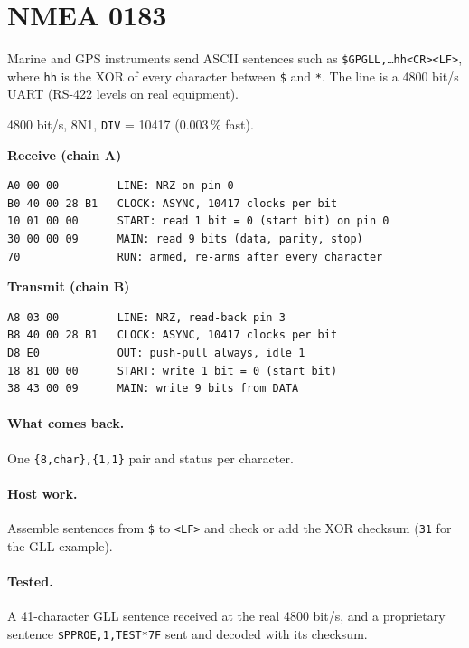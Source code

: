 \documentclass[11pt,a4paper]{article}
\newcommand{\sig}[1]{\texttt{#1}}
\newcommand{\progtitle}[1]{\par\smallskip\textbf{\small\color{accent}#1}\par\nopagebreak}
\newcommand{\facts}[1]{\par\noindent\colorbox{codebg}{\parbox{\dimexpr\linewidth-2\fboxsep}{\small #1}}\par}
\begin{document}
\section{NMEA 0183}
Marine and GPS instruments send ASCII sentences such as \texttt{\$GPGLL,\ldots*hh<CR><LF>}, where \texttt{hh} is the XOR of every character between \texttt{\$} and \texttt{*}. The line is a 4800 bit/s UART (RS-422 levels on real equipment).
\facts{4800 bit/s, 8N1, \sig{DIV} = 10417 (0.003\,\% fast).}
\progtitle{Receive (chain A)}
\begin{lstlisting}
A0 00 00         LINE: NRZ on pin 0
B0 40 00 28 B1   CLOCK: ASYNC, 10417 clocks per bit
10 01 00 00      START: read 1 bit = 0 (start bit) on pin 0
30 00 00 09      MAIN: read 9 bits (data, parity, stop)
70               RUN: armed, re-arms after every character
\end{lstlisting}
\progtitle{Transmit (chain B)}
\begin{lstlisting}
A8 03 00         LINE: NRZ, read-back pin 3
B8 40 00 28 B1   CLOCK: ASYNC, 10417 clocks per bit
D8 E0            OUT: push-pull always, idle 1
18 81 00 00      START: write 1 bit = 0 (start bit)
38 43 00 09      MAIN: write 9 bits from DATA
\end{lstlisting}
\paragraph{What comes back.} One \texttt{\{8,char\},\{1,1\}} pair and status per character.

\paragraph{Host work.} Assemble sentences from \texttt{\$} to \texttt{<LF>} and check or add the XOR checksum (\texttt{31} for the GLL example).

\paragraph{Tested.} A 41-character GLL sentence received at the real 4800 bit/s, and a proprietary sentence \texttt{\$PPROE,1,TEST*7F} sent and decoded with its checksum.
\end{document}
